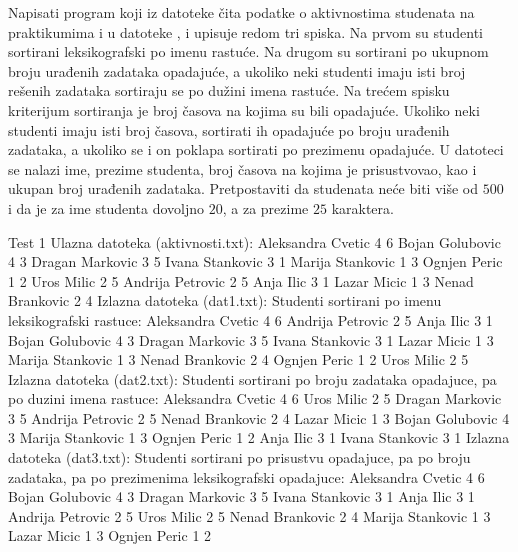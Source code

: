 \begin{Answer}[ref=512]
\end{Answer}
\begin{Exercise}[label=513]
   Napisati program koji iz datoteke  čita
   podatke o aktivnostima studenata na praktikumima i u datoteke
   ,  i  upisuje redom
   tri spiska. Na prvom su studenti sortirani leksikografski po imenu
   rastuće. Na drugom su sortirani po ukupnom broju urađenih zadataka
   opadajuće, a ukoliko neki studenti imaju isti broj rešenih zadataka
   sortiraju se po dužini imena rastuće. Na trećem spisku kriterijum
   sortiranja je broj časova na kojima su bili opadajuće. Ukoliko neki
   studenti imaju isti broj časova, sortirati ih opadajuće po broju
   urađenih zadataka, a ukoliko se i on poklapa sortirati po prezimenu
   opadajuće. U datoteci se nalazi ime, prezime studenta, broj časova
   na kojima je prisustvovao, kao i ukupan broj urađenih
   zadataka. Pretpostaviti da studenata neće biti više od $500$ i da
   je za ime studenta dovoljno $20$, a za prezime $25$ karaktera.
  
\begin{maxitest}
\begin{test}{Test 1}
Ulazna datoteka (aktivnosti.txt):
  Aleksandra Cvetic 4 6
  Bojan Golubovic 4 3
  Dragan Markovic 3 5
  Ivana Stankovic 3 1
  Marija Stankovic 1 3
  Ognjen Peric 1 2
  Uros Milic 2 5
  Andrija Petrovic 2 5
  Anja Ilic 3 1
  Lazar Micic 1 3
  Nenad Brankovic 2 4
Izlazna datoteka (dat1.txt):
  Studenti sortirani po imenu leksikografski rastuce:
  Aleksandra Cvetic  4  6
  Andrija Petrovic  2  5
  Anja Ilic  3  1
  Bojan Golubovic  4  3
  Dragan Markovic  3  5
  Ivana Stankovic  3  1
  Lazar Micic  1  3
  Marija Stankovic  1  3
  Nenad Brankovic  2  4
  Ognjen Peric  1  2
  Uros Milic  2  5
Izlazna datoteka (dat2.txt):
  Studenti sortirani po broju zadataka opadajuce,
  pa po duzini imena rastuce:
  Aleksandra Cvetic  4  6
  Uros Milic  2  5
  Dragan Markovic  3  5
  Andrija Petrovic  2  5
  Nenad Brankovic  2  4
  Lazar Micic  1  3
  Bojan Golubovic  4  3
  Marija Stankovic  1  3
  Ognjen Peric  1  2
  Anja Ilic  3  1
  Ivana Stankovic  3  1
Izlazna datoteka (dat3.txt):
  Studenti sortirani po prisustvu opadajuce,
  pa po broju zadataka,
  pa po prezimenima leksikografski opadajuce:
  Aleksandra Cvetic  4  6
  Bojan Golubovic  4  3
  Dragan Markovic  3  5
  Ivana Stankovic  3  1
  Anja Ilic  3  1
  Andrija Petrovic  2  5
  Uros Milic  2  5
  Nenad Brankovic  2  4
  Marija Stankovic  1  3
  Lazar Micic  1  3
  Ognjen Peric  1  2
\end{test}
\end{maxitest}
  
\end{Exercise}

